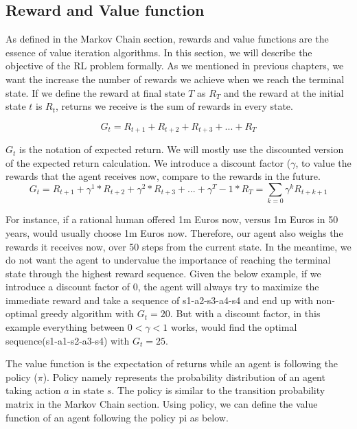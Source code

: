 \subsection{Reward and Value function}

As defined in the Markov Chain section, rewards and value functions are the essence of value iteration algorithms. In this section, we will describe the objective of the RL problem formally. As we mentioned in previous chapters, we want the increase the number of rewards we achieve when we reach the terminal state. If we define the reward at final state \(T\) as \(R_T\) and the reward at the initial state \(t\) is \(R_t\), returns we receive is the sum of rewards in every state.

\begin{equation}
    G_t = R_{t+1} + R_{t+2} + R_{t+3} + ... + R_T    
\end{equation}


\(G_t\) is the notation of expected return. We will mostly use the discounted version of the expected return calculation. We introduce a discount factor (\(\gamma\), to value the rewards that the agent receives now, compare to the rewards in the future. 
\begin{equation}
    G_t = R_{t+1} + \gamma^1*R_{t+2} + \gamma^2*R_{t+3} + ... + \gamma^T-1*R_T = \sum\limits_{k=0}\gamma^kR_{t+k+1}
\end{equation}

For instance, if a rational human offered 1m Euros now, versus 1m Euros in 50 years, would usually choose 1m Euros now. Therefore, our agent also weighs the rewards it receives now, over 50 steps from the current state.  In the meantime, we do not want the agent to undervalue the importance of reaching the terminal state through the highest reward sequence.  Given the below example, if we introduce a discount factor of 0, the agent will always try to maximize the immediate reward and take a sequence of s1-a2-s3-a4-s4 and end up with non-optimal greedy algorithm with \(G_t = 20 \). But with a discount factor, in this example everything between \(0< \gamma < 1\) works, would find the optimal sequence(s1-a1-s2-a3-s4) with \(G_t = 25\).

The value function is the expectation of returns while an agent is following the policy (\(\pi\)). Policy namely represents the probability distribution of an agent taking action \(a\) in state \(s\). The policy is similar to the transition probability matrix in the Markov Chain section. Using policy, we can define the value function of an agent following the policy pi as below.